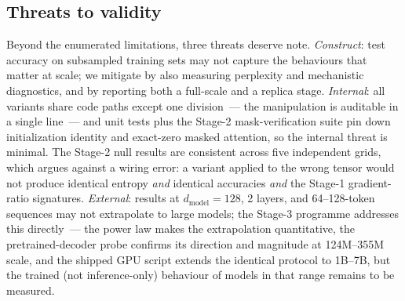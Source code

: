 \subsection{Threats to validity}\label{sec:threats}
Beyond the enumerated limitations, three threats deserve note. \emph{Construct}:
test accuracy on subsampled training sets may not capture the behaviours that
matter at scale; we mitigate by also measuring perplexity and mechanistic
diagnostics, and by reporting both a full-scale and a replica stage.
\emph{Internal}: all variants share code paths except one division~--- the
manipulation is auditable in a single line~--- and unit tests plus the
Stage-2 mask-verification suite pin down initialization identity and exact-zero
masked attention, so the internal threat is minimal. The Stage-2 null results
are consistent across five independent grids, which argues against a wiring
error: a variant applied to the wrong tensor would not produce identical
entropy \emph{and} identical accuracies \emph{and} the Stage-1 gradient-ratio
signatures. \emph{External}: results at $d_{\text{model}} = 128$, 2 layers, and
64--128-token sequences may not extrapolate to large models; the Stage-3
programme addresses this directly~--- the power law makes the extrapolation
quantitative, the pretrained-decoder probe confirms its direction and
magnitude at 124M--355M scale, and the shipped GPU script extends the identical
protocol to 1B--7B, but the trained (not inference-only) behaviour of models
in that range remains to be measured.

